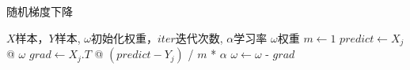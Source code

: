 \documentclass[11pt]{article}
\begin{document}
\begin{CJK*}{UTF8}{gkai}
    \begin{algorithm}
        \caption{随机梯度下降}
        \begin{algorithmic}[1] %
            \Require $X$样本，$Y$样本, $\omega$初始化权重，$iter$迭代次数, $\alpha$学习率
            \Ensure $\omega$权重
            	\State $m \gets 1$
						\State $predict \gets X_j$ @ $\omega$
						\State $grad \gets X_j.T$ @ $(predict-Y_j)$ / $m$ * $\alpha$
						\State $\omega \gets \omega$ - $grad$
					\EndFor
                \EndFor
                \State \Return{$\omega$}
            \EndFunction
        \end{algorithmic}
    \end{algorithm}
\end{CJK*}
\end{document}
